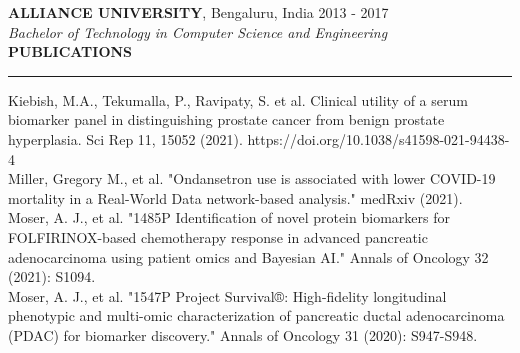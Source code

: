 \documentclass[a4paper]{article}
\newcommand{\myline}{\par
  \kern2pt %
  \hrule height 0.5pt
  \kern2pt %
}
\newcommand{\mybullet}{
	\indent 
  \textbullet \hspace*{2mm}
}
\begin{document}
 	\noindent
	\textbf{ALLIANCE UNIVERSITY}, Bengaluru, India \hfill 2013 - 2017 \\
	\textit{Bachelor of Technology in Computer Science and Engineering} \\

	\noindent
	{\large \textbf{PUBLICATIONS}}
	\myline 
	\smallskip

  \mybullet Kiebish, M.A., Tekumalla, P., Ravipaty, S. et al. Clinical utility of a serum biomarker panel in distinguishing prostate cancer from benign prostate hyperplasia. Sci Rep 11, 15052 (2021). https://doi.org/10.1038/s41598-021-94438-4 \\
  \mybullet Miller, Gregory M., et al. "Ondansetron use is associated with lower COVID-19 mortality in a Real-World Data network-based analysis." medRxiv (2021). \\
  \mybullet Moser, A. J., et al. "1485P Identification of novel protein biomarkers for FOLFIRINOX-based chemotherapy response in advanced pancreatic adenocarcinoma using patient omics and Bayesian AI." Annals of Oncology 32 (2021): S1094.\\
  \mybullet Moser, A. J., et al. "1547P Project Survival®: High-fidelity longitudinal phenotypic and multi-omic characterization of pancreatic ductal adenocarcinoma (PDAC) for biomarker discovery." Annals of Oncology 31 (2020): S947-S948.\\
	

	
	
\end{document}

